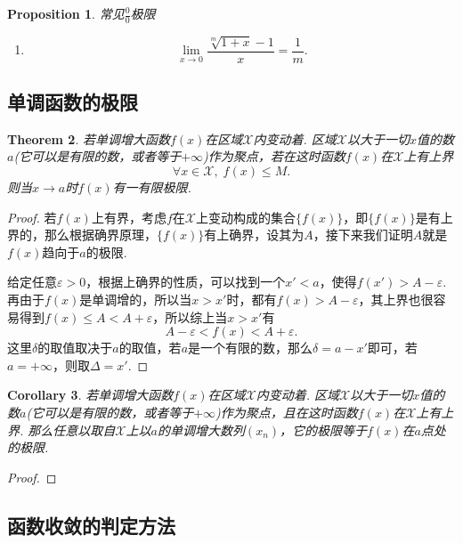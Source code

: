 \documentclass{article}
\newtheorem{theorem}{Theorem}[section]
\newtheorem{corollary}[theorem]{Corollary}
\newtheorem{proposition}[theorem]{Proposition}
\begin{document}
\begin{proposition}
\rm {\color{red}常见$\frac{0}{0}$极限}
\begin{enumerate}
	\item 
	$$
	\lim\limits_{x \rightarrow 0} \frac{\sqrt[m]{1+x}-1}{x} = \frac{1}{m}.
	$$
\end{enumerate}
\end{proposition}

\subsection{单调函数的极限}

\begin{theorem}
\rm 若单调增大函数$f(x)$在区域$\mathcal{X}$内变动着. 区域$\mathcal{X}$以大于一切$x$值的数$a$(它可以是有限的数，或者等于$+\infty$)作为聚点，若在这时函数$f(x)$在$\mathcal{X}$上有上界
$$
\forall x \in \mathcal{X},\;f(x) \leq M.
$$
则当$x \rightarrow a$时$f(x)$有一有限极限. 
\end{theorem}

\begin{proof}
若$f(x)$上有界，考虑$f$在$\mathcal{X}$上变动构成的集合$\{f(x)\}$，即$\{f(x)\}$是有上界的，那么根据确界原理，$\{f(x)\}$有上确界，设其为$A$，接下来我们证明$A$就是$f(x)$趋向于$a$的极限.

给定任意$\varepsilon > 0$，根据上确界的性质，可以找到一个$x' < a$，使得$f(x') > A-\varepsilon$. 再由于$f(x)$是单调增的，所以当$x > x'$时，都有$f(x) > A -\varepsilon$，其上界也很容易得到$f(x) \leq A < A+\varepsilon$，所以综上当$x > x'$有
$$
A-\varepsilon < f(x) < A+\varepsilon.
$$
这里$\delta$的取值取决于$a$的取值，若$a$是一个有限的数，那么$\delta = a-x'$即可，若$a = +\infty$，则取$\Delta = x'$. 
\end{proof}

\begin{corollary}
\rm 若单调增大函数$f(x)$在区域$\mathcal{X}$内变动着. 区域$\mathcal{X}$以大于一切$x$值的数$a$(它可以是有限的数，或者等于$+\infty$)作为聚点，且在这时函数$f(x)$在$\mathcal{X}$上有上界. 那么任意以取自$\mathcal{X}$上以$a$的单调增大数列$(x_n)$，它的极限等于$f(x)$在$a$点处的极限. 
\end{corollary}

\begin{proof}
\rm 
\end{proof}

\subsection{函数收敛的判定方法}
\end{document}

